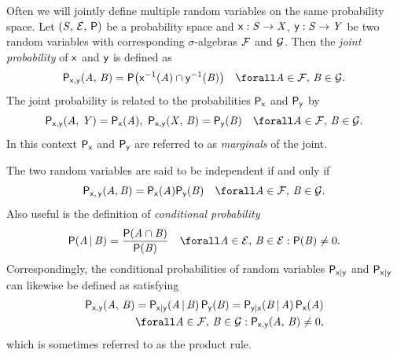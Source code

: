 Often we will jointly define multiple random variables on the same probability space. Let $(\mathit{S},\,\mathcal{E},\,\mathsf{P})$ be a probability space and $\mathsf{x} : \mathit{S} \to \mathit{X}$, $\mathsf{y} : \mathit{S} \to \mathit{Y}$ be two random variables with corresponding $\sigma$-algebras $\mathcal{F}$ and $\mathcal{G}$. Then the \emph{joint probability} of $\mathsf{x}$ and $\mathsf{y}$ is defined as
\begin{equation}\label{eq:joint-probability-rvar}
  \prob{\rvar{x},\rvar{y}}(\set{A},\,\set{B}) = 
  \probability\lpa \rvar{x}^{-1}(\set{A}) \cap \rvar{y}^{-1}(\set{B})\rpa
  \quad \forall \set{A} \in \sset{F},\,\set{B} \in \sset{G}.
\end{equation}
The joint probability is related to the probabilities $\mathsf{P}_{\mathsf{x}}$ and $\mathsf{P}_{\mathsf{y}}$ by
\begin{equation}\label{eq:sum-rule-rvar}
  \prob{\rvar{x},\rvar{y}}(\set{A},\,\set{Y}) =
  \prob{\rvar{x}}(\set{A}),~
  \prob{\rvar{x},\rvar{y}}(\set{X},\,\set{B}) =
  \prob{\rvar{y}}(\set{B})
  \quad \forall \set{A} \in \sset{F},\,\set{B} \in \sset{G}.
\end{equation}
In this context $\mathsf{P}_{\mathsf{x}}$ and $\mathsf{P}_{\mathsf{y}}$ are referred to as \emph{marginals} of the joint.

The two random variables are said to be independent if and only if
\begin{equation}\label{eq:independent-rvars}
  \prob{\rvar{x},\,\rvar{y}}(\set{A},\set{B}) = \prob{\rvar{x}}(\set{A})\prob{\rvar{y}}(\set{B})
  \quad \forall \set{A} \in \sset{F},\,\set{B} \in \sset{G}.
\end{equation}
Also useful is the definition of \emph{conditional probability}
\begin{equation}\label{eq:conditional-probability}
  \probability(\set{A} \gvn \set{B}) =
  \frac{\probability(\set{A} \cap \set{B})}{\probability(\set{B})}
  \quad \forall \set{A} \in \sset{E},\,\set{B} \in \sset{E} : \probability(\set{B}) \neq 0.
\end{equation}
Correspondingly, the conditional probabilities of random variables $\mathsf{P}_{\mathsf{x}|\mathsf{y}}$ and $\mathsf{P}_{\mathsf{x}|\mathsf{y}}$ can likewise be defined as satisfying
\begin{equation}\label{eq:product-rule}
\begin{split}
  \prob{\rvar{x},\rvar{y}}(\set{A},\,\set{B}) =
  \prob{\rvar{x}|\rvar{y}}(\set{A} \gvn \set{B}) \, \prob{\rvar{y}}(\set{B}) =
  \prob{\rvar{y}|\rvar{x}}(\set{B} \gvn \set{A}) \, \prob{\rvar{x}}(\set{A})\\
  \forall \set{A} \in \sset{F},\,\set{B} \in \sset{G} : 
  \prob{\rvar{x},\rvar{y}}(\set{A},\,\set{B}) \neq 0,
\end{split}
\end{equation}
which is sometimes referred to as the product rule. 

